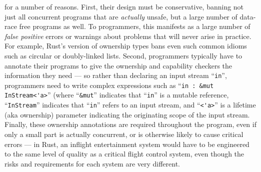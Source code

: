 \cite{SafeRust,FightRust} for a number of
reasons. First, their design must be conservative, banning not just
all concurrent programs that are \textit{actually} unsafe, but a large
number of data-race free programs as well.  To programmers, this
manifests as a large number of \textit{false positive} errors or
warnings about problems that will never arise in practice.  For
example, Rust's version of ownership types\cite{RustBook} bans even
such common idioms such as circular or doubly-linked lists.  Second,
programmers typically have to annotate their programs to give the
ownership and capability checkers the information they need --- so
rather than declaring an input stream ``\verb+in+'', programmers need
to write complex expressions such as ``\verb+in : &mut InStream<'a>+''
(where ``\verb+&mut+'' indicates that ``\verb+in+'' is a mutable
reference, ``\verb+InStream+'' indicates that ``\verb+in+'' refers to
an input stream, and  ``\verb+<'a>+'' is a lifetime (aka ownership)
parameter indicating the originating scope of the input stream.
Finally, these ownership annotations are required throughout
the program,  even if only a small part is actually concurrent, or is
otherwise likely to cause critical errors --- in Rust, an inflight
entertainment system would have to be engineered to the same level of
quality as a critical flight control system, even though the risks and
requirements for each system are very different.


%
%
%
%

